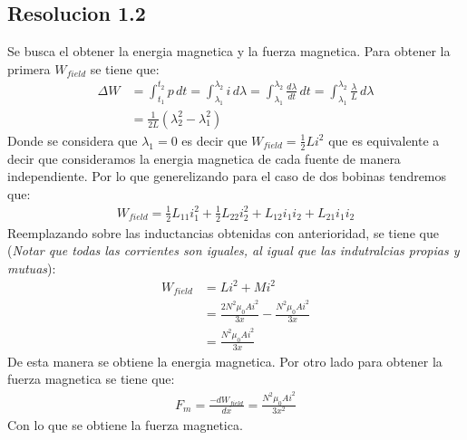 \documentclass[
  11pt,
  letterpaper,
   addpoints,
   answers
  ]{exam}
\begin{document}
\begin{questions}
\begin{solution}
        \subsection*{Resolucion 1.2}
        Se busca el obtener la energia magnetica y la fuerza magnetica. Para obtener la primera $W_{field}$ se tiene que:
        \begin{align}
            \Delta W &= \int_{t_{1}}^{t_{2}} p \, dt = \int_{\lambda_{1}}^{\lambda_{2}} i \, d\lambda = \int_{\lambda_{1}}^{\lambda_{2}} \frac{d\lambda}{dt} \, dt = \int_{\lambda_{1}}^{\lambda_{2}} \frac{\lambda}{L} \, d\lambda \\
            &= \frac{1}{2L} \left( \lambda_{2}^{2} - \lambda_{1}^{2} \right)
            \end{align}
        Donde se considera que $\lambda_{1}= 0$ es decir que $W_{field} = \frac{1}{2}Li^{2}$ que es equivalente a decir que consideramos la energia magnetica de cada fuente de manera independiente. Por lo que generelizando para el caso de dos bobinas tendremos que:
        \begin{align}
            W_{field} = \frac{1}{2}L_{11}i_{1}^{2} + \frac{1}{2}L_{22}i_{2}^{2} + L_{12}i_{1}i_{2} + L_{21}i_{1}i_{2}
        \end{align}
        Reemplazando sobre las inductancias obtenidas con anterioridad, se tiene que (\textit{Notar que todas las corrientes son iguales, al igual que las indutralcias propias y mutuas}):
        \begin{align}
            W_{field}&= Li^{2} + Mi^{2}\\
                     &= \frac{2N^{2}\mu_{0}Ai^{2}}{3x} - \frac{N^{2}\mu_{0}Ai^{2}}{3x}\\
                        &= \frac{N^{2}\mu_{0}Ai^{2}}{3x} 
        \end{align} 
        De esta manera se obtiene la energia magnetica. Por otro lado para obtener la fuerza magnetica se tiene que:
        \begin{align}
            F_{m} = \frac{-dW_{field}}{dx} = \frac{N^{2}\mu_{0}Ai^{2}}{3x^{2}}
        \end{align}
        Con lo que se obtiene la fuerza magnetica.

\end{solution}
\end{questions}
\end{document}
